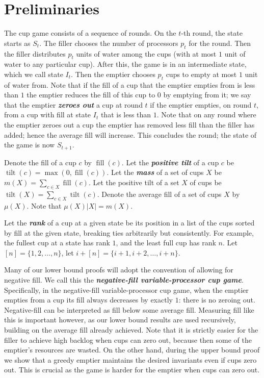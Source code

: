 \documentclass[twocolumn]{article}[10pt]
\newcommand{\defn}[1]{{\textit{\textbf{\boldmath #1}}}\xspace}
\DeclareMathOperator{\tilt}{\text{tilt}}
\DeclareMathOperator{\fil}{\text{fill}}
\begin{document}
\section{Preliminaries}\label{sec:prelims}
The cup game consists of a sequence of rounds. On the $t$-th round, the state
starts as $S_t$. The filler chooses the number of processors $p_t$ for the
round. Then the filler distributes $p_t$ units of water among the cups (with at
most $1$ unit of water to any particular cup). After this, the game is in an
intermediate state, which we call state $I_t$. Then the emptier chooses $p_t$
cups to empty at most $1$ unit of water from. Note that if the fill of a cup
that the emptier empties from is less than $1$ the emptier reduces the fill of
this cup to $0$ by emptying from it; we say that the emptier \defn{zeroes out}
a cup at round $t$ if the emptier empties, on round $t$, from a cup with fill
at state $I_t$ that is less than $1$. Note that on any round where the emptier
zeroes out a cup the emptier has removed less fill than the filler has added;
hence the average fill will increase. This concludes the round; the state of
the game is now $S_{t+1}$.

Denote the fill of a cup $c$ by $\fil(c)$. Let the \defn{positive tilt} of a cup $c$ be
$\tilt(c) = \max(0, \fil(c))$. Let the \defn{mass} of a set of cups $X$
be $m(X) = \sum_{c\in X} \fil(c)$. 
Let the positive tilt of a set $X$ of cups be $\tilt(X) = \sum_{c\in X} \tilt(c)$. 
Denote the average fill of a set of cups $X$
by $\mu(X)$. Note that $\mu(X) |X| = m(X)$.

Let the \defn{rank} of a cup at a given state be its position in a list of the
cups sorted by fill at the given state, breaking ties arbitrarily but
consistently. For example, the fullest cup at a state has rank $1$, and the
least full cup has rank $n$. Let $[n] = \{1,2,\ldots, n\}$, let $i+[n] = \{i+1, i+2, \ldots, i+n\}$.

Many of our lower bound proofs will adopt the convention of allowing for
negative fill. We call this the \defn{negative-fill variable-processor cup
game}. Specifically, in the negative-fill variable-processor cup game, when the
emptier empties from a cup its fill always decreases by exactly $1$: there is
no zeroing out. Negative-fill can be interpreted as fill below some average
fill. Measuring fill like this is important however, as our lower bound results
are used recursively, building on the average fill already achieved. Note that
it is strictly easier for the filler to achieve high backlog when cups can zero
out, because then some of the emptier's resources are wasted. On the other hand,
during the upper bound proof we show that a greedy emptier maintains the
desired invariants even if cups zero out. This is crucial as the game is harder
for the emptier when cups can zero out.
\end{document}
